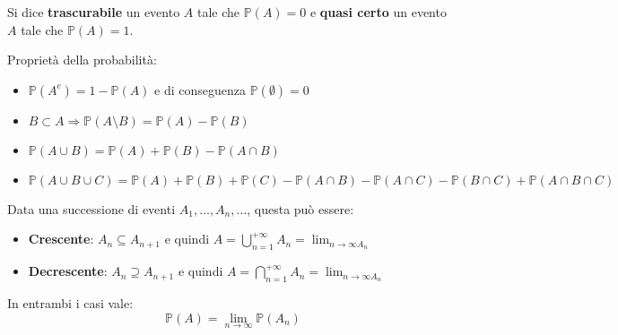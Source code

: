 \begin{note}
	Si dice \textbf{trascurabile} un evento $A$ tale che $\mathbb{P}(A)=0$ e \textbf{quasi certo} un evento $A$ tale che $\mathbb{P}(A)=1$. 
\end{note}
\begin{proposition}
	Proprietà della probabilità:
	\begin{itemize}
		\item $\mathbb{P}(A^c)=1-\mathbb{P}(A)$ e di conseguenza $\mathbb{P}(\emptyset)=0$
		\item $B \subset A \Longrightarrow \mathbb{P}(A\setminus B)=\mathbb{P}(A) - \mathbb{P}(B)$
		\item $\mathbb{P}(A\cup B)=\mathbb{P}(A)+\mathbb{P}(B)-\mathbb{P}(A \cap B)$
		\item $\mathbb{P}(A \cup B \cup C) = \mathbb{P}(A) + \mathbb{P}(B) + \mathbb{P}(C) - \mathbb{P}(A \cap B) - \mathbb{P}(A \cap C) - \mathbb{P}(B \cap C) + \mathbb{P}(A \cap B \cap C)$
	\end{itemize}
\end{proposition}
\begin{proposition}
	Data una successione di eventi $A_1, \ldots, A_n, \ldots$, questa può essere:
	\begin{itemize}
		\item \textbf{Crescente}: $A_n \subseteq A_{n+1}$ e quindi $A = \bigcup_{n=1}^{+\infty}A_n = \lim_{n \to  \infty A_n}$
		\item \textbf{Decrescente}: $A_n  \supseteq A_{n+1}$ e quindi $A = \bigcap_{n=1}^{+\infty}A_n = \lim_{n \to  \infty A_n}$
	\end{itemize}
	In entrambi i casi vale:
	\begin{equation}
		\mathbb{P}(A) = \lim_{n \to \infty}\mathbb{P}(A_n)
	\end{equation}
\end{proposition}